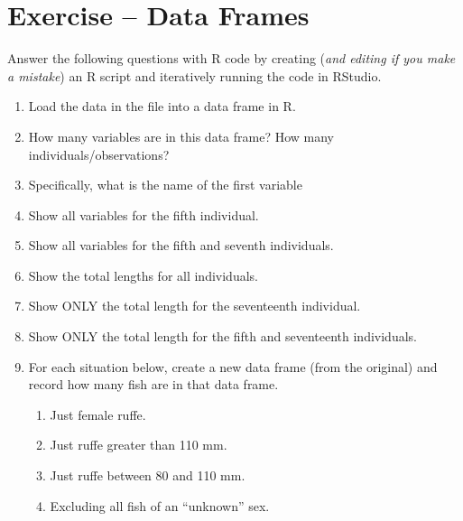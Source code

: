 \documentclass{article}\usepackage[]{graphicx}\usepackage[]{color}
\newif\ifmakekey
\begin{document}

\section*{Exercise -- Data Frames}
Answer the following questions with R code by creating (\textit{and editing if you make a mistake}) an R script and iteratively running the code in RStudio.

\begin{enumerate}
  \item Load the data in the  file into a data frame in R.


  \item How many variables are in this data frame?  How many individuals/observations?


\ifmakekey
  There are 10 variables and 40 individuals/observations in this data frame.
\fi
  \item Specifically, what is the name of the first variable
\ifmakekey
\\ The name of the first variable is fishID.
\fi
  \item Show all variables for the fifth individual.


  \item Show all variables for the fifth and seventh individuals.


  \item Show the total lengths for all individuals.


  \item Show ONLY the total length for the seventeenth individual.


  \item Show ONLY the total length for the fifth and seventeenth individuals.


  \item For each situation below, create a new data frame (from the original) and record how many fish are in that data frame.
    \begin{enumerate}
      \item Just female ruffe.


      \item Just ruffe greater than 110 mm.


      \item Just ruffe between 80 and 110 mm.


      \item Excluding all fish of an ``unknown'' sex.



\end{enumerate}
\end{enumerate}
\end{document}
